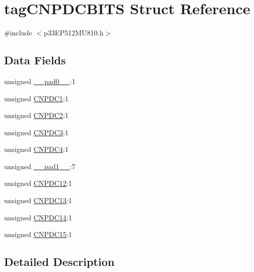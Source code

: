 \hypertarget{structtag_c_n_p_d_c_b_i_t_s}{}\section{tag\+C\+N\+P\+D\+C\+B\+I\+TS Struct Reference}
\label{structtag_c_n_p_d_c_b_i_t_s}


{\ttfamily \#include $<$p33\+E\+P512\+M\+U810.\+h$>$}

\subsection*{Data Fields}
\begin{DoxyCompactItemize}
\item 
unsigned \hyperlink{structtag_c_n_p_d_c_b_i_t_s_adf71f3d8410c1f1dbbc96680a92c49af}{\+\_\+\+\_\+pad0\+\_\+\+\_\+}\+:1
\item 
unsigned \hyperlink{structtag_c_n_p_d_c_b_i_t_s_ac954e3f738f75c8b085bba080bbaad5b}{C\+N\+P\+D\+C1}\+:1
\item 
unsigned \hyperlink{structtag_c_n_p_d_c_b_i_t_s_aa31497c6c511495c915f7cd0d80cf73d}{C\+N\+P\+D\+C2}\+:1
\item 
unsigned \hyperlink{structtag_c_n_p_d_c_b_i_t_s_a370e1e317f15954d3dede4990927aa7d}{C\+N\+P\+D\+C3}\+:1
\item 
unsigned \hyperlink{structtag_c_n_p_d_c_b_i_t_s_a0af791c444ef107e444978aac227ad3c}{C\+N\+P\+D\+C4}\+:1
\item 
unsigned \hyperlink{structtag_c_n_p_d_c_b_i_t_s_acaf2d0924a107ec6e8d2e31febaf66f9}{\+\_\+\+\_\+pad1\+\_\+\+\_\+}\+:7
\item 
unsigned \hyperlink{structtag_c_n_p_d_c_b_i_t_s_a17e5f75f3643174a679cfdc5e454f248}{C\+N\+P\+D\+C12}\+:1
\item 
unsigned \hyperlink{structtag_c_n_p_d_c_b_i_t_s_ad558825700b664ee4b438a0303bf329e}{C\+N\+P\+D\+C13}\+:1
\item 
unsigned \hyperlink{structtag_c_n_p_d_c_b_i_t_s_a2a3b92771c61b5054a4de462434d413c}{C\+N\+P\+D\+C14}\+:1
\item 
unsigned \hyperlink{structtag_c_n_p_d_c_b_i_t_s_ade16f5610059deece94878d6158d8b2d}{C\+N\+P\+D\+C15}\+:1
\end{DoxyCompactItemize}


\subsection{Detailed Description}


